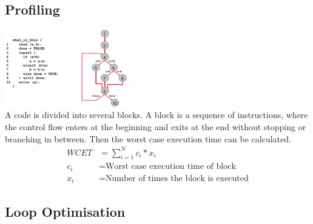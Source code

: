 	\subsection{Profiling}
	\begin{multicols}{2}
		\includegraphics[width=0.4\textwidth]{./pictures/profiling.png} \\
		A code is divided into several blocks. A block is a sequence of instructions, where the control flow enters at the beginning and exits at the end without stopping or branching in between. Then the worst case execution time can be calculated.
		\begin{equation*}
			\begin{aligned}
				WCET &= \sum_{i=1}^{N} c_i * x_i \\
				c_i &= \text{Worst case execution time of block} \\
				x_i &= \text{Number of times the block is executed}
			\end{aligned}
		\end{equation*}			
	\end{multicols}
	
	\subsection{Loop Optimisation }	
		\begin{multicols}{3}		
			 \ \\
			 \ \\
			
		\end{multicols}	
				

